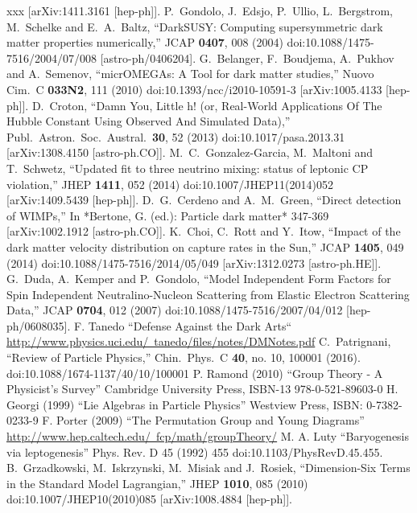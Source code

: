 \begin{thebibliography}{xxx}
  [arXiv:1411.3161 [hep-ph]].
    P.~Gondolo, J.~Edsjo, P.~Ullio, L.~Bergstrom, M.~Schelke and E.~A.~Baltz,
  ``DarkSUSY: Computing supersymmetric dark matter properties numerically,''
  JCAP {\bf 0407}, 008 (2004)
  doi:10.1088/1475-7516/2004/07/008
  [astro-ph/0406204].
    G.~Belanger, F.~Boudjema, A.~Pukhov and A.~Semenov,
  ``micrOMEGAs: A Tool for dark matter studies,''
  Nuovo Cim.\ C {\bf 033N2}, 111 (2010)
  doi:10.1393/ncc/i2010-10591-3
  [arXiv:1005.4133 [hep-ph]].
    D.~Croton,
  ``Damn You, Little h! (or, Real-World Applications Of The Hubble Constant Using Observed And Simulated Data),''
  Publ.\ Astron.\ Soc.\ Austral.\  {\bf 30}, 52 (2013)
  doi:10.1017/pasa.2013.31
  [arXiv:1308.4150 [astro-ph.CO]].
    M.~C.~Gonzalez-Garcia, M.~Maltoni and T.~Schwetz,
  ``Updated fit to three neutrino mixing: status of leptonic CP violation,''
  JHEP {\bf 1411}, 052 (2014)
  doi:10.1007/JHEP11(2014)052
    [arXiv:1409.5439 [hep-ph]].
    D.~G.~Cerdeno and A.~M.~Green,
  ``Direct detection of WIMPs,''
  In *Bertone, G. (ed.): Particle dark matter* 347-369
  [arXiv:1002.1912 [astro-ph.CO]].
    K.~Choi, C.~Rott and Y.~Itow,
  ``Impact of the dark matter velocity distribution on capture rates in the Sun,''
  JCAP {\bf 1405}, 049 (2014)
  doi:10.1088/1475-7516/2014/05/049
  [arXiv:1312.0273 [astro-ph.HE]].
    G.~Duda, A.~Kemper and P.~Gondolo,
  ``Model Independent Form Factors for Spin Independent Neutralino-Nucleon Scattering from Elastic Electron Scattering Data,''
  JCAP {\bf 0704}, 012 (2007)
  doi:10.1088/1475-7516/2007/04/012
  [hep-ph/0608035].
  F. Tanedo ``Defense Against the Dark Arts``\\ \href{http://www.physics.uci.edu/~tanedo/files/notes/DMNotes.pdf}{http://www.physics.uci.edu/~tanedo/files/notes/DMNotes.pdf}
   C.~Patrignani,
  ``Review of Particle Physics,''
  Chin.\ Phys.\ C {\bf 40}, no. 10, 100001 (2016).
  doi:10.1088/1674-1137/40/10/100001 
  P. Ramond (2010) ``Group Theory - A Physicist's Survey'' Cambridge University Press, ISBN-13 978-0-521-89603-0 
 H. Georgi (1999) ``Lie Algebras in Particle Physics'' Westview Press, ISBN: 0-7382-0233-9
 F. Porter (2009) ``The Permutation Group and Young Diagrams'' \href{http://www.hep.caltech.edu/~fcp/math/groupTheory/}{http://www.hep.caltech.edu/~fcp/math/groupTheory/}
 M. A. Luty ``Baryogenesis via leptogenesis'' Phys. Rev. D 45 (1992) 455 doi:10.1103/PhysRevD.45.455.
  B.~Grzadkowski, M.~Iskrzynski, M.~Misiak and J.~Rosiek,
  ``Dimension-Six Terms in the Standard Model Lagrangian,''
  JHEP {\bf 1010}, 085 (2010)
  doi:10.1007/JHEP10(2010)085
  [arXiv:1008.4884 [hep-ph]].
\end{thebibliography}